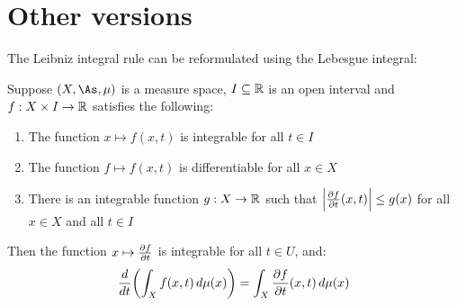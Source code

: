 \documentclass[main.tex]{subfiles}
\begin{document}
\section{Other versions}

The Leibniz integral rule can be reformulated using the Lebesgue integral:

\begin{theorem}
    Suppose $(X,\As,\mu)$ is a measure space, $I\sub\R$ is an open interval and $f:X\times I\to\R$ satisfies the following:
    \begin{enumerate}
        \item The function $x\mapsto f(x,t)$ is integrable for all $t\in I$
        \item The function $f\mapsto f(x,t)$ is differentiable for all $x\in X$
        \item There is an integrable function $g:X\to\R$ such that $\abs{\pdv{f}{t}\/(x,t)}\le g(x)$ for all $x\in X$ and all $t\in I$
    \end{enumerate}
    Then the function $x\mapsto\pdv{f}{t}(x,t)$ is integrable for all $t\in U$, and:
    \begin{equation*}
        \dv{t}\qty(\int_X f(x,t)\,d\mu(x)) = \int_X \pdv{f}{t}\/(x,t)\,d\mu(x)
    \end{equation*}
\end{theorem}
\end{document}
